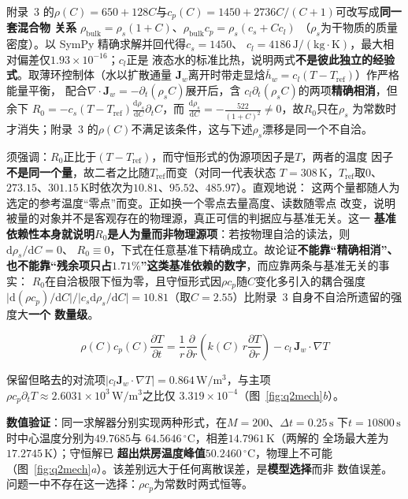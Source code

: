 \documentclass[withoutpreface,bwprint]{cumcmthesis} %
\begin{document}
附录~3 的$\rho(C)=650+128C$与$c_p(C)=1450+2736C/(C+1)$可改写成\textbf{同一套混合物
关系} $\rho_{\mathrm{bulk}}=\rho_s(1+C)$、$\rho_{\mathrm{bulk}}c_p=\rho_s(c_s+Cc_l)$
（$\rho_s$为干物质的质量密度）。以 SymPy 精确求解并回代得$c_s=1450$、
$c_l=4186\,\mathrm{J/(kg\cdot K)}$，最大相对偏差仅$1.93\times10^{-16}$；$c_l$正是
液态水的标准比热，说明两式\textbf{不是彼此独立的经验式}。取薄环控制体（水以扩散通量
$\mathbf{J}_w$离开时带走显焓$\bar h_w=c_l(T-T_{\mathrm{ref}})$）作严格能量平衡，
配合$\nabla\!\cdot\!\mathbf{J}_w=-\partial_t(\rho_sC)$展开后，含
$c_l\partial_t(\rho_sC)$的两项\textbf{精确相消}，但余下
$R_0=-c_s(T-T_{\mathrm{ref}})\frac{\mathrm{d}\rho_s}{\mathrm{d}C}\partial_tC$，而
$\frac{\mathrm{d}\rho_s}{\mathrm{d}C}=-\frac{522}{(1+C)^2}\neq0$，故$R_0$只在$\rho_s$
为常数时才消失；附录~3 的$\rho(C)$不满足该条件，这与下述$\rho_s$漂移是同一个不自洽。

须强调：$R_0$正比于$(T-T_{\mathrm{ref}})$，而守恒形式的伪源项因子是$T$，两者的温度
因子\textbf{不是同一个量}，故二者之比随$T_{\mathrm{ref}}$而变（对同一代表状态
$T=308\,\mathrm{K}$，$T_{\mathrm{ref}}$取$0$、$273.15$、$301.15\,\mathrm{K}$时依次为$10.81$、$95.52$、$485.97$）。直观地说：
这两个量都随人为选定的参考温度``零点''而变。正如换一个零点去量高度、读数随零点
改变，说明被量的对象并不是客观存在的物理源，真正可信的判据应与基准无关。这一
\textbf{基准依赖性本身就说明$R_0$是人为量而非物理源项}：若按物理自洽的读法，则$\mathrm{d}\rho_s/\mathrm{d}C=0$、
$R_0\equiv0$，下式在任意基准下精确成立。故论证\textbf{不能靠``精确相消''、
也不能靠``残余项只占$1.71\%$''这类基准依赖的数字}，而应靠两条与基准无关的事实：
$R_0$在自洽极限下恒为零，且守恒形式因$\rho c_p$随$C$变化多引入的耦合强度
$\bigl|\mathrm{d}(\rho c_p)/\mathrm{d}C\bigr|/\bigl|c_s\mathrm{d}\rho_s/\mathrm{d}C
\bigr|=\mathbf{10.81}$（取$C=2.55$）比附录~3 自身不自洽所遗留的强度大\textbf{一个
数量级}。

\begin{equation}
\label{eq:q2govT}
 \rho(C)c_p(C)\frac{\partial T}{\partial t}
=\frac{1}{r}\frac{\partial}{\partial r}\!\left(k(C)\,r\frac{\partial T}{\partial r}\right)
-c_l\,\mathbf{J}_w\!\cdot\!\nabla T
\end{equation}

保留但略去的对流项$|c_l\mathbf{J}_w\!\cdot\!\nabla T|=0.864\,\mathrm{W/m^3}$，与主项
$\rho c_p\partial_tT\approx2.6031\times10^{3}\,\mathrm{W/m^3}$之比仅
$3.319\times10^{-4}$（图~\ref{fig:q2mech}\emph{b}）。

\textbf{数值验证}：同一求解器分别实现两种形式，在$M=200$、$\Delta t=0.25\,\mathrm{s}$
下$t=10800\,\mathrm{s}$时中心温度分别为$\mathbf{49.7685}$与
$\mathbf{64.5646}\,^\circ\mathrm{C}$，相差$\mathbf{14.7961}\,\mathrm{K}$（两解的
全场最大差为$\mathbf{17.2745}\,\mathrm{K}$）；守恒解已
\textbf{超出烘房温度峰值}$50.2460\,^\circ\mathrm{C}$，物理上不可能
（图~\ref{fig:q2mech}\emph{a}）。该差别远大于任何离散误差，是\textbf{模型选择}而非
数值误差。问题一中不存在这一选择：$\rho c_p$为常数时两式恒等。
\end{document}
